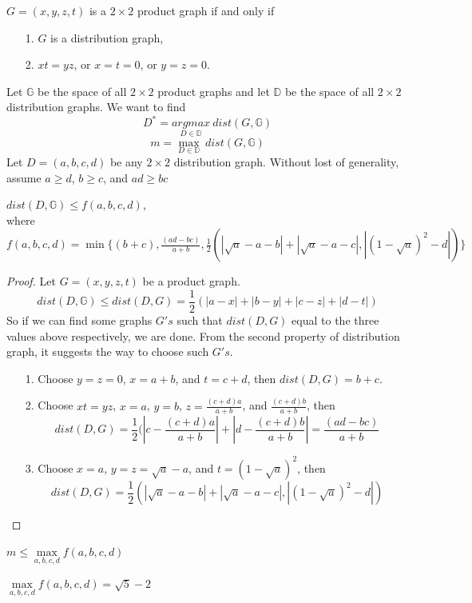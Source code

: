 \begin{definition}
$G = (x,y,z,t)$ is a $2 \times 2$ product graph if and only if 
\begin{itemize}
\item [1.] $G$ is a distribution graph,
\item [2.] $xt = yz$, or $x = t = 0$, or $y =z = 0$.
\end{itemize}
\end{definition}

 
Let $\mathbb{G}$ be the space of all $2 \times 2$ product graphs and let $\mathbb{D}$ be the space of all $2 \times 2$ distribution graphs. We want to find 
$$ D^* = \underset{D \in \mathbb{D}} {argmax} \ dist(G, \mathbb{G})$$
$$m = \underset{D \in \mathbb{D}} {\max} \ dist(G, \mathbb{G})$$
Let $D = (a,b,c,d)$ be any $2 \times 2$ distribution graph. Without lost of generality, assume $a \geq d$,  $b \geq c$, and $ad \geq bc$ 

\begin{claim}
$dist(D, \mathbb{G}) \leq f(a,b,c,d)$, \\
where $f(a,b,c,d) = \min \{(b+c), \frac{(ad - bc)}{a+b},
\frac{1}{2}(| \sqrt{a} - a - b| + |\sqrt{a} - a - c|, |(1 - \sqrt{a})^2 -d|) \}$
\end{claim}

\begin{proof}
Let $G = (x,y,z,t)$ be a product graph.  
$$dist(D,\mathbb{G}) \leq dist(D,G) = \frac{1}{2} (|a-x| + |b-y| + |c-z| + |d-t|)$$
So if we can find some graphs $G's$ such that $dist(D,G)$ equal to the three values above respectively, we are done. From the second property of distribution graph, it suggests the way to choose such $G's$.
\begin{itemize}
\item [1.] Choose $y = z =0$, $x = a+b$, and $t = c+d$, then $dist(D,G) = b+c$.
\item [2.] Choose $xt = yz$, $x = a$, $y =b$, $z = \frac{(c+d)a}{a+b}$, and $\frac{(c+d)b}{a+b}$, then 
$$dist(D,G) = \frac{1}{2}(|c - \frac{(c+d)a}{a+b}| + |d - \frac{(c+d)b}{a+b}|
= \frac{(ad - bc)}{a+b} $$
\item [3.] Choose $x = a$, $y = z = \sqrt{a} - a$, and $t = (1 - \sqrt{a})^2$, then 
$$dist(D,G) = \frac{1}{2}(| \sqrt{a} - a - b| + |\sqrt{a} - a - c|, |(1 - \sqrt{a})^2 -d|) $$
\end{itemize}
\end{proof}

\begin{claim}
$m \leq \underset {a,b,c,d} {\max} f(a,b,c,d)$
\end{claim} 
\begin{claim} 
$\underset {a,b,c,d} {\max} f(a,b,c,d) = \sqrt{5} -2$
\end{claim}

